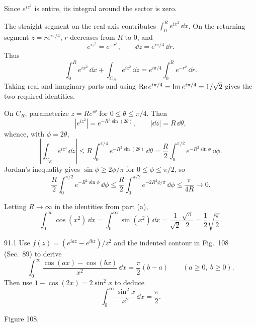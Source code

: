 \documentclass[11pt,oneside]{article}
\begin{document}
\begin{solution}
Since $e^{iz^2}$ is entire, its integral around the sector is zero.
\begin{exercisesubparts}
    \item The straight segment on the real axis contributes $\int_0^R e^{ix^2}\,\dd x$. On the returning segment $z=re^{i\pi/4}$, $r$ decreases from $R$ to $0$, and
    \[
        e^{iz^2}=e^{-r^2},\qquad \dd z=e^{i\pi/4}\,\dd r.
    \]
    Thus
    \[
        \int_0^R e^{ix^2}\,\dd x
        +\int_{C_R}e^{iz^2}\,\dd z
        =e^{i\pi/4}\int_0^R e^{-r^2}\,\dd r.
    \]
    Taking real and imaginary parts and using $\operatorname{Re} e^{i\pi/4}=\operatorname{Im} e^{i\pi/4}=1/\sqrt2$ gives the two required identities.

    \item On $C_R$, parameterize $z=Re^{i\theta}$ for $0\le\theta\le\pi/4$. Then
    \[
        |e^{iz^2}|=e^{-R^2\sin(2\theta)},\qquad |\dd z|=R\,\dd\theta,
    \]
    whence, with $\phi=2\theta$,
    \[
        \left|\int_{C_R}e^{iz^2}\,\dd z\right|
        \le R\int_0^{\pi/4}e^{-R^2\sin(2\theta)}\,\dd\theta
        =\frac R2\int_0^{\pi/2}e^{-R^2\sin\phi}\,\dd\phi.
    \]
    Jordan's inequality gives $\sin\phi\ge2\phi/\pi$ for $0\le\phi\le\pi/2$, so
    \[
        \frac R2\int_0^{\pi/2}e^{-R^2\sin\phi}\,\dd\phi
        \le\frac R2\int_0^{\pi/2}e^{-2R^2\phi/\pi}\,\dd\phi
        \le\frac\pi{4R}\longrightarrow0.
    \]

    \item Letting $R\to\infty$ in the identities from part (a),
    \[
        \boxed{\int_0^\infty\cos(x^2)\,\dd x
           =\int_0^\infty\sin(x^2)\,\dd x
           =\frac1{\sqrt2}\frac{\sqrt\pi}{2}
           =\frac12\sqrt{\frac\pi2}.}
    \]
\end{exercisesubparts}
\end{solution}

\begin{exercise}{91.1}
Use $f(z)=(e^{iaz}-e^{ibz})/z^2$ and the indented contour in Fig.~108 (Sec.~89) to derive
\[
    \int_0^\infty\frac{\cos(ax)-\cos(bx)}{x^2}\,\dd x
    =\frac\pi2(b-a)\qquad(a\ge0,\ b\ge0).
\]
Then use $1-\cos(2x)=2\sin^2x$ to deduce
\[
    \int_0^\infty\frac{\sin^2x}{x^2}\,\dd x=\frac\pi2.
\]
\begin{center}
\par\small Figure 108.
\end{center}
\end{exercise}
\end{document}
